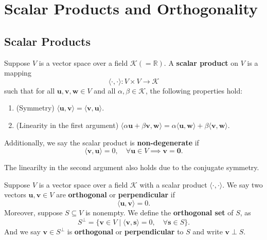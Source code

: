 	\chapter{Scalar Products and Orthogonality}


	\section{Scalar Products}
	\begin{definitionenv}
		Suppose $V$ is a vector space over a field $\mathcal{K}(=\mathbb{R})$. A \textbf{scalar product} on $V$ is a mapping
		\[
		\langle \cdot, \cdot \rangle : V \times V \to \mathcal{K}
		\]
		such that for all $\bm{u}, \bm{v}, \bm{w} \in V$ and all $\alpha, \beta \in \mathcal{K}$, the following properties hold:
		\begin{enumerate}
			\item (Symmetry) $\langle \bm{u}, \bm{v} \rangle = \langle \bm{v}, \bm{u} \rangle$.
			\item (Linearity in the first argument) $\langle \alpha \bm{u} + \beta \bm{v}, \bm{w} \rangle = \alpha \langle \bm{u}, \bm{w} \rangle + \beta \langle \bm{v}, \bm{w} \rangle$.
		\end{enumerate}
		Additionally, we say the scalar product is \textbf{non-degenerate} if
		\[
		\langle \bm{v}, \bm{u} \rangle = 0, \quad \forall \bm{u} \in V \implies \bm{v} = \bm{0}.
		\]
	\end{definitionenv}
	\begin{remarkenv}
		The linearilty in the second argument also holds due to the conjugate symmetry.
	\end{remarkenv}
	\begin{definitionenv}
		Suppose $V$ is a vector space over a field $\mathcal{K}$ with a scalar product $\langle \cdot, \cdot \rangle$. We say two vectors $\bm{u}, \bm{v} \in V$ are \textbf{orthogonal} or \textbf{perpendicular} if
		\[
		\langle \bm{u}, \bm{v} \rangle = 0.
		\]
		Moreover, suppose $S \subseteq V$ is nonempty. We define the \textbf{orthogonal set} of $S$, as
		\[
		S^\perp = \{ \bm{v} \in V \mid \langle \bm{v}, \bm{s} \rangle = 0, \quad \forall \bm{s} \in S \}.
		\]
		And we say $\bm{v}\in S^\perp$ is \textbf{orthogonal} or \textbf{perpendicular} to $S$ and write $\bm{v} \perp S$.
	\end{definitionenv}
